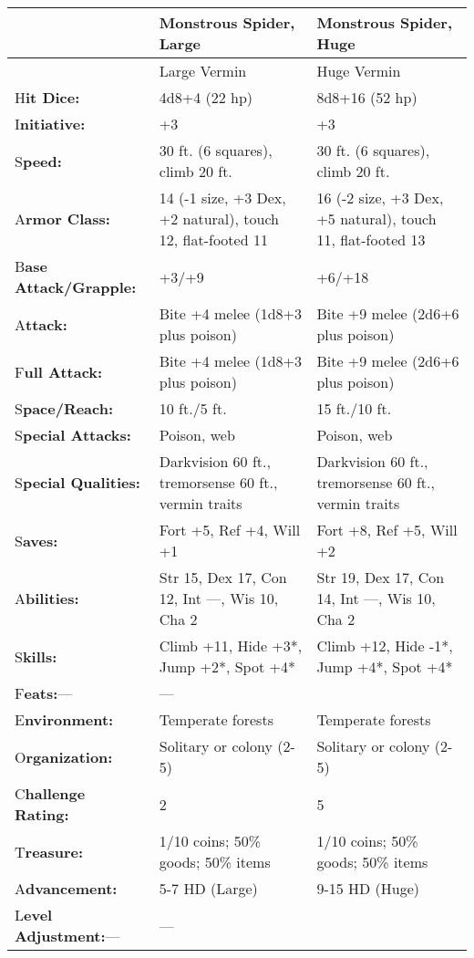 \documentclass{article}
\begin{document}
\vspace{12pt}
\begin{tabular}{|>{\raggedright}p{59pt}|>{\raggedright}p{127pt}|>{\raggedright}p{127pt}|}
\hline
  & M\textbf{onstrous Spider, Large} & M\textbf{onstrous Spider, Huge}\tabularnewline
\hline
  & Large Vermin & Huge Vermin\tabularnewline
\hline
H\textbf{it Dice:} & 4d8+4 (22 hp) & 8d8+16 (52 hp)\tabularnewline
\hline
I\textbf{nitiative:} & +3 & +3\tabularnewline
\hline
S\textbf{peed:} & 30 ft. (6 squares), climb 20 ft. & 30 ft. (6 squares), climb 
20 ft.\tabularnewline
\hline
A\textbf{rmor Class:} & 14 (-1 size, +3 Dex, +2 natural), touch 12, flat-footed 
11 & 16 (-2 size, +3 Dex, +5 natural), touch 11, flat-footed 13\tabularnewline
\hline
B\textbf{ase Attack/Grapple:} & +3/+9 & +6/+18\tabularnewline
\hline
A\textbf{ttack:} & Bite +4 melee (1d8+3 plus poison) & Bite +9 melee (2d6+6 plus 
poison)\tabularnewline
\hline
F\textbf{ull Attack:} & Bite +4 melee (1d8+3 plus poison) & Bite +9 melee (2d6+6 
plus poison)\tabularnewline
\hline
S\textbf{pace/Reach:} & 10 ft./5 ft. & 15 ft./10 ft.\tabularnewline
\hline
S\textbf{pecial Attacks:} & Poison, web & Poison, web\tabularnewline
\hline
S\textbf{pecial Qualities:} & Darkvision 60 ft., tremorsense 60 ft., vermin traits & Darkvision 
60 ft., tremorsense 60 ft., vermin traits\tabularnewline
\hline
S\textbf{aves:} & Fort +5, Ref +4, Will +1 & Fort +8, Ref +5, Will +2\tabularnewline
\hline
A\textbf{bilities:} & Str 15, Dex 17, Con 12, Int ---, Wis 10, Cha 2 & Str 19, 
Dex 17, Con 14, Int ---, Wis 10, Cha 2\tabularnewline
\hline
S\textbf{kills:} & Climb +11, Hide +3*, Jump +2*, Spot +4* & Climb +12, Hide -1*, 
Jump +4*, Spot +4*\tabularnewline
\hline
F\textbf{eats:}--- & --- & \tabularnewline
\hline
E\textbf{nvironment:} & Temperate forests & Temperate forests\tabularnewline
\hline
O\textbf{rganization:} & Solitary or colony (2-5) & Solitary or colony (2-5)\tabularnewline
\hline
C\textbf{hallenge Rating:} & 2 & 5\tabularnewline
\hline
T\textbf{reasure:} & 1/10 coins; 50\% goods; 50\% items & 1/10 coins; 50\% goods; 
50\% items\tabularnewline
\hline
A\textbf{dvancement:} & 5-7 HD (Large) & 9-15 HD (Huge)\tabularnewline
\hline
L\textbf{evel Adjustment:}--- & --- & \tabularnewline
\hline
\end{tabular}
\end{document}

